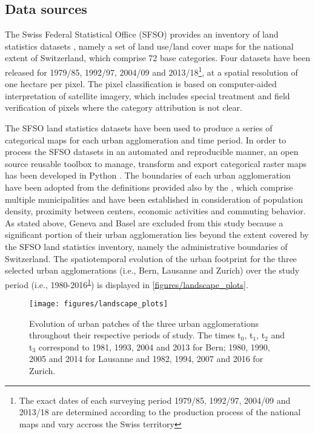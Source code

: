 \subsection*{Data sources}

The Swiss Federal Statistical Office (SFSO) provides an inventory of land statistics datasets , namely a set of land use/land cover maps for the national extent of Switzerland, which comprise 72 base categories. Four datasets have been released for 1979/85, 1992/97, 2004/09 and 2013/18\footnote{\label{fn:years}The exact dates of each surveying period 1979/85, 1992/97, 2004/09 and 2013/18 are determined according to the production process of the national maps and vary accross the Swiss territory }, at a spatial resolution of one hectare per pixel.
The pixel classification is based on computer-aided interpretation of satellite imagery, which includes special treatment and field verification of pixels where the category attribution is not clear.

The SFSO land statistics datasets have been used to produce a series of categorical maps for each urban agglomeration and time period.
In order to process the SFSO datasets in an automated and reproducible manner, an open source reusable toolbox to manage, transform and export categorical raster maps has been developed in Python \citep{bosch2019swisslandstats}.
The boundaries of each urban agglomeration have been adopted from the definitions provided also by the , which comprise multiple municipalities and have been established in consideration of population density, proximity between centers, economic activities and commuting behavior.
As stated above, Geneva and Basel are excluded from this study because a significant portion of their urban agglomeration lies beyond the extent covered by the SFSO land statistics inventory, namely the administrative boundaries of Switzerland.
The spatiotemporal evolution of the urban footprint for the three selected urban agglomerations (i.e., Bern, Lausanne and Zurich) over the study period (i.e., 1980-2016\textsuperscript{\ref{fn:years}}) is displayed in \autoref{figures/landscape_plots}.

\begin{figure}[!ht]
  \begin{adjustwidth}{0cm}{-.4\textwidth}
    \centering  
    \texttt{[image: figures/landscape\_plots]}
    \caption[Evolution of urban patches]{\label{figures/landscape_plots}Evolution of urban patches of the three urban agglomerations throughout their respective periods of study. The times t$_0$, t$_1$, t$_2$ and t$_3$ correspond to 1981, 1993, 2004 and 2013 for Bern; 1980, 1990, 2005 and 2014 for Lausanne and 1982, 1994, 2007 and 2016 for Zurich.}
  \end{adjustwidth}
\end{figure}


